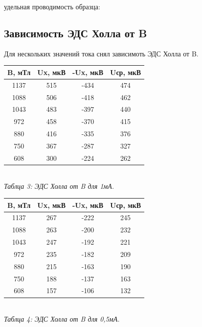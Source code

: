  удельная проводимость образца: 

\subsection{Зависимость ЭДС Холла от B}

Для нескольких значений тока снял зависимоть ЭДС Холла от B.

\begin{table} [h!]
    \begin{center}
    \begin{tabular}{|c|c|c|c|} \hline
        B, мТл & Ux, мкВ & -Ux, мкВ & Uср, мкВ \\ \hline
        1137 & 515  & -434 & 474 \\ \hline
        1088 & 506  & -418 & 462 \\ \hline
        1043 & 483  & -397 & 440 \\ \hline
        972  & 458  & -370 & 415 \\ \hline
        880  & 416  & -335 & 376 \\ \hline
        750  & 367  & -287 & 327 \\ \hline
        608  & 300  & -224 & 262 \\ \hline
    \end{tabular} \\ [0.2cm]
    \textit{Таблца 3: ЭДС Холла от B для 1мА.}
    \end{center}
\end{table}

\newpage

\begin{table} [h!]
    \begin{center}
    \begin{tabular}{|c|c|c|c|} \hline
        B, мТл & Ux, мкВ & -Ux, мкВ & Uср, мкВ \\ \hline
        1137 & 267  & -222 & 245 \\ \hline
        1088 & 263  & -200 & 232 \\ \hline
        1043 & 247  & -192 & 221 \\ \hline
        972  & 235  & -182 & 209 \\ \hline
        880  & 215  & -163 & 190 \\ \hline
        750  & 188  & -137 & 163 \\ \hline
        608  & 157  & -106 & 132 \\ \hline
    \end{tabular} \\ [0.2cm]
    \textit{Таблца 4: ЭДС Холла от B для 0,5мА.}
    \end{center}
\end{table}

